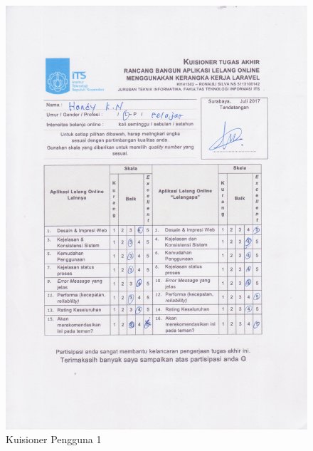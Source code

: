 \begin{figure}[]
	\centering
	\includegraphics[width=\textwidth]{images/bab5/ujipengguna/7.jpg}
	\caption{Kuisioner Pengguna 1}
	\label{quest-7}
\end{figure}
